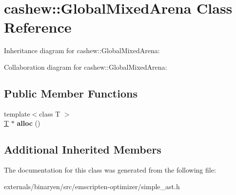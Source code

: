 \hypertarget{classcashew_1_1_global_mixed_arena}{}\section{cashew\+:\+:Global\+Mixed\+Arena Class Reference}
\label{classcashew_1_1_global_mixed_arena}


Inheritance diagram for cashew\+:\+:Global\+Mixed\+Arena\+:


Collaboration diagram for cashew\+:\+:Global\+Mixed\+Arena\+:
\subsection*{Public Member Functions}
\begin{DoxyCompactItemize}
\item 
\mbox{\label{classcashew_1_1_global_mixed_arena_a18e47d04cd62789a2209e3e9393902a3}} 
{\footnotesize template$<$class T $>$ }\\\mbox{\hyperlink{struct_t}{T}} $\ast$ {\bfseries alloc} ()
\end{DoxyCompactItemize}
\subsection*{Additional Inherited Members}


The documentation for this class was generated from the following file\+:\begin{DoxyCompactItemize}
\item 
externals/binaryen/src/emscripten-\/optimizer/simple\+\_\+ast.\+h\end{DoxyCompactItemize}
